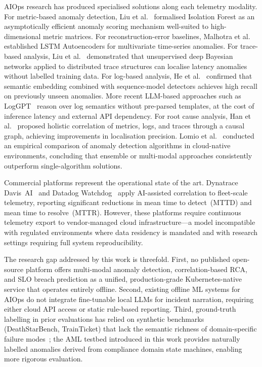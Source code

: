 \documentclass[a4paper,anonymous,UKenglish]{lipics-v2021}
\begin{document}
AIOps research has produced specialised solutions along each telemetry
modality. For metric-based anomaly detection, Liu et
al.~\cite{liu2012isolation} formalised Isolation Forest as an asymptotically
efficient anomaly scoring mechanism well-suited to high-dimensional metric
matrices. For reconstruction-error baselines, Malhotra et
al.~\cite{malhotra2016lstm} established LSTM Autoencoders for multivariate
time-series anomalies. For trace-based analysis, Liu et
al.~\cite{liu2020unsupervised} demonstrated that unsupervised deep Bayesian
networks applied to distributed trace structures can localise latency anomalies
without labelled training data. For log-based analysis, He et
al.~\cite{he2021bert} confirmed that semantic embedding combined with
sequence-model detectors achieves high recall on previously unseen anomalies.
More recent LLM-based approaches such as LogGPT~\cite{qi2023loggpt} reason
over log semantics without pre-parsed templates, at the cost of inference
latency and external API dependency. For root cause analysis, Han et
al.~\cite{han2024holistic} proposed holistic correlation of metrics, logs, and
traces through a causal graph, achieving improvements in localisation precision.
Lomio et al.~\cite{lomio2022anomaly} conducted an empirical comparison of
anomaly detection algorithms in cloud-native environments, concluding that
ensemble or multi-modal approaches consistently outperform single-algorithm
solutions.

Commercial platforms represent the operational state of the art. Dynatrace
Davis~AI~\cite{dynatrace2023} and Datadog Watchdog~\cite{datadog2023} apply
AI-assisted correlation to fleet-scale telemetry, reporting significant
reductions in mean time to detect~(MTTD) and mean time to resolve~(MTTR).
However, these platforms require continuous telemetry export to vendor-managed
cloud infrastructure---a model incompatible with regulated environments where
data residency is mandated and with research settings requiring full system
reproducibility.

The research gap addressed by this work is threefold. First, no published
open-source platform offers multi-modal anomaly detection, correlation-based
RCA, and SLO breach prediction as a unified, production-grade Kubernetes-native
service that operates entirely offline. Second, existing offline ML systems for
AIOps do not integrate fine-tunable local LLMs for incident narration, requiring
either cloud API access or static rule-based reporting. Third, ground-truth
labelling in prior evaluations has relied on synthetic benchmarks
(DeathStarBench, TrainTicket) that lack the semantic richness of
domain-specific failure modes~\cite{soldani2022anomaly}; the AML testbed
introduced in this work provides naturally labelled anomalies derived from
compliance domain state machines, enabling more rigorous evaluation.
\end{document}
